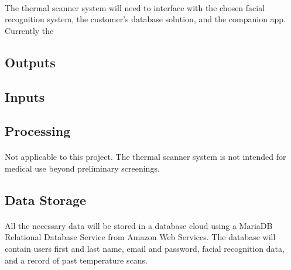 \documentclass[12pt, letterpaper]{article}
\begin{document}
    \paragraph{}
    The thermal scanner system will need to interface with the chosen facial recognition system, the customer's database solution,
    and the companion app. Currently the 
    \subsection{Outputs}
    \subsection{Inputs}
    \subsection{Processing}
    \paragraph{}
    Not applicable to this project. The thermal scanner system is not intended for medical use beyond preliminary
    screenings.
    \subsection{Data Storage}
    \paragraph{}
    All the necessary data will be stored in a database cloud using a MariaDB 
    Relational Database Service from Amazon Web Services. The database will contain 
    users first and last name, email and password, facial recognition data, and a 
    record of past temperature scans.
\end{document}

